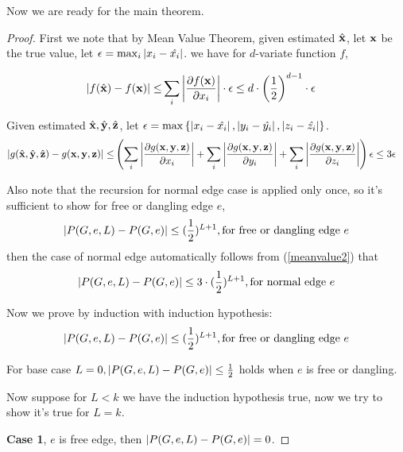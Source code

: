 	Now we are ready for the main theorem.

	\begin{proof}
		First we note that by Mean Value Theorem,
		given estimated $\hat{\bf x}$, let ${\bf x}$ be the true value, let $\epsilon = \max_i{\left\vert x_i - \hat{x_i}\right\vert}$.
		we have for $d$-variate function $f$,

		\begin{align}
		\left\vert f(\hat{\bf x}) - f({\bf x})\right\vert \leq& \sum_i\left\vert \frac{\partial f({\bf x})}{\partial x_i}\right\vert \cdot \epsilon 
		\leq  d\cdot \left( \frac{1}{2} \right)^{d-1} \cdot \epsilon
		\label{meanvalue1}
		\end{align}

		Given estimated $\hat{\bf x},\hat{\bf y},\hat{\bf z}$, let $\epsilon = \max \left\{\left\vert x_i - \hat{x_i}\right\vert, \left\vert y_i - \hat{y_i} \right\vert , \left\vert z_i - \hat{z_i}\right\vert\right\}$.
		\begin{align}
		\left\vert g(\hat{\bf x}, \hat{\bf y}, \hat{\bf z}) - g({\bf x,y,z})\right\vert \leq & \left(  \sum_i\left\vert \frac{\partial g({\bf x,y,z})}{\partial x_i}\right\vert + \sum_i\left\vert \frac{\partial g({\bf x,y,z})}{\partial y_i}\right\vert +  \sum_i\left\vert \frac{\partial g({\bf x,y,z})}{\partial z_i}\right\vert \right)  \epsilon 
		\leq  3\epsilon
		\label{meanvalue2}
		\end{align}


		Also note that the recursion for normal edge case is applied only once, so it's sufficient to show for free or dangling edge $e$,
		\[\left\vert P(G,e,L) - P(G,e)\right\vert \leq (\frac{1}{2})^{L+1}, \textrm{for free or dangling edge $e$}\]
		then the case of normal edge automatically follows from (\ref{meanvalue2}) that
		\[\left\vert P(G,e,L) - P(G,e)\right\vert \leq 3\cdot(\frac{1}{2})^{L+1}, \textrm{for normal edge $e$}\]

		Now we prove by induction with induction hypothesis:
		\[\left\vert P(G,e,L) - P(G,e)\right\vert \leq (\frac{1}{2})^{L+1}, \textrm{for free or dangling edge $e$}\]
		
		For base case $L=0, \left\vert P(G,e,L) - P(G,e)\right\vert \leq \frac{1}{2}$ holds when $e$ is free or dangling.%

		Now suppose for $L<k$ we have the induction hypothesis true, now we try to show it's true for $L=k$.

		{\bf Case 1}, $e$ is free edge, then $\left\vert P(G,e,L) - P(G,e)\right\vert = 0$.


\end{proof}

